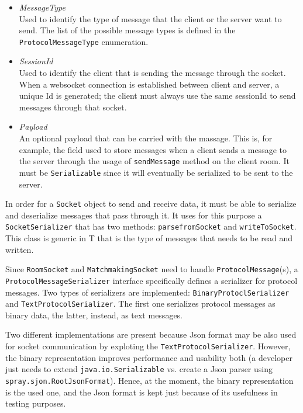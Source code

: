 \begin{itemize}
	\item \textit{MessageType} \\
	Used to identify the type of message that the client or the server want to send. The list of the possible message types is defined in the \texttt{ProtocolMessageType} enumeration.
	\item \textit{SessionId} \\
	Used to identify the client that is sending the message through the socket. When a websocket connection is established between client and server, a unique Id is generated; the client must always use the same sessionId to send messages through that socket.
	\item \textit{Payload} \\
	An optional payload that can be carried with the massage. This is, for example, the field used to store messages when a client sends a message to the server through the usage of \texttt{sendMessage} method on the client room. It must be \texttt{Serializable} since it will eventually be serialized to be sent to the server.
\end{itemize}

In order for a \texttt{Socket} object to send and receive data, it must be able to serialize and deserialize messages that pass through it. It uses for this purpose a \texttt{SocketSerializer} that has two methods: \texttt{parsefromSocket} and \texttt{writeToSocket}. This class is generic in T that is the type of messages that needs to be read and written.

Since \texttt{RoomSocket} and \texttt{MatchmakingSocket} need to handle \texttt{ProtocolMessage}(s), a \texttt{ProtocolMessageSerializer} interface specifically defines a serializer for protocol messages. Two types of serializers are implemented: \texttt{BinaryProtoclSerializer} and \texttt{TextProtocolSerializer}. The first one serializes protocol messages as binary data, the latter, instead, as text messages.
 
Two different implementations are present because Json format may be also used for socket communication by exploting the \texttt{TextProtocolSerializer}. However, the binary representation improves performance and usability both (a developer just needs to extend \texttt{java.io.Serializable} vs. create a Json parser using \texttt{spray.sjon.RootJsonFormat}). Hence, at the moment, the binary representation is the used one, and the Json format is kept just because of its usefulness in testing purposes.

